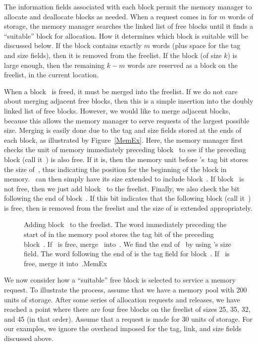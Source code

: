 The information fields associated with each block permit the memory
manager to allocate and deallocate blocks as needed.
When a request comes in for $m$ words of storage, the memory manager
searches the linked list of free blocks until it finds a
``suitable'' block for allocation.
How it determines which block is suitable will be discussed below.
If the block contains exactly $m$ words (plus space for the tag and
size fields), then it is removed from the freelist.
If the block (of size $k$) is large enough, then the remaining $k-m$
words are reserved as a block on the freelist, in the current
location.

When a block~ is freed, it must be merged into the freelist.
If we do not care about merging adjacent free blocks, then this
is a simple insertion into the doubly linked list of free blocks.
However, we would like to merge adjacent blocks, because
this allows the memory manager to serve requests of the largest
possible size.
Merging is easily done due to the tag and size fields stored at the
ends of each block, as illustrated by Figure~\ref{MemEx}.
Here, the memory manager first checks the unit of memory immediately
preceding block~ to see if the preceding block (call
it~) is also free.
If it is, then the memory unit before 's~tag bit stores
the size of~, thus indicating the position for the beginning
of the block in memory.
~can then simply have its size extended to include
block~.
If block~ is not free, then we just add block~ to the
freelist.
Finally, we also check the bit following the end of block~.
If this bit indicates that the following block (call it~) is
free, then  is removed from the freelist and the size of
 is extended appropriately.

\begin{figure}
\vspace{-\smallskipamount}
{Adding block~ to the freelist.
The word immediately preceding the start of  in the memory
pool stores the tag bit of the preceding block~.
If~ is free, merge~ into~.
We find the end of~ by using 's size field.
The word following the end of  is the tag field for
block~.
If~ is free, merge it into~.}{MemEx}
\bigskip
\end{figure}

We now consider how a ``suitable'' free block is selected to service a
memory request.
To illustrate the process, assume that we have a memory pool with 200
units of storage. After some series of allocation requests and releases,
we have reached a point where there are four free blocks
on the freelist of sizes 25, 35, 32, and 45 (in that order).
Assume that a request is made for 30 units of storage.
For our examples, we ignore the overhead imposed for the tag, link,
and size fields discussed above.

